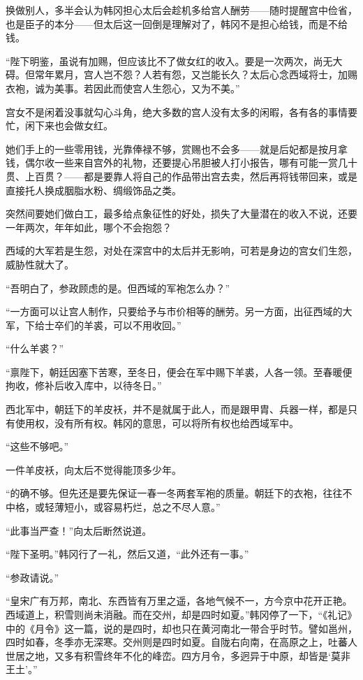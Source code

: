 换做别人，多半会认为韩冈担心太后会趁机多给宫人酬劳——随时提醒宫中俭省，也是臣子的本分——但太后这一回倒是理解对了，韩冈不是担心给钱，而是不给钱。

“陛下明鉴，虽说有加赐，但应该比不了做女红的收入。要是一次两次，尚无大碍。但常年累月，宫人岂不怨？人若有怨，又岂能长久？太后心念西域将士，加赐衣袍，诚为美事。若因此而使宫人生怨心，又为不美。”

宫女不是闲着没事就勾心斗角，绝大多数的宫人没有太多的闲暇，各有各的事情要忙，闲下来也会做女红。

她们手上的一些零用钱，光靠俸禄不够，赏赐也不会多——就是后妃都是按月拿钱，偶尔收一些来自宫外的礼物，还要提心吊胆被人打小报告，哪有可能一赏几十贯、上百贯？——都是要靠人将自己的作品带出宫去卖，然后再将钱带回来，或是直接托人换成胭脂水粉、绸缎饰品之类。

突然间要她们做白工，最多给点象征性的好处，损失了大量潜在的收入不说，还要一年两次，年年如此，哪个不会抱怨？

西域的大军若是生怨，对处在深宫中的太后并无影响，可若是身边的宫女们生怨，威胁性就大了。

“吾明白了，参政顾虑的是。但西域的军袍怎么办？”

“一方面可以让宫人制作，只要给予与市价相等的酬劳。另一方面，出征西域的大军，下给士卒们的羊裘，可以不用收回。”

“什么羊裘？”

“禀陛下，朝廷因塞下苦寒，至冬日，便会在军中赐下羊裘，人各一领。至春暖便拘收，修补后收入库中，以待冬日。”

西北军中，朝廷下的羊皮袄，并不是就属于此人，而是跟甲胄、兵器一样，都是只有使用权，没有所有权。韩冈的意思，可以将所有权也给西域军中。

“这些不够吧。”

一件羊皮袄，向太后不觉得能顶多少年。

“的确不够。但先还是要先保证一春一冬两套军袍的质量。朝廷下的衣袍，往往不中格，或轻薄短小，或容易朽烂，总之不尽人意。”

“此事当严查！”向太后断然说道。

“陛下圣明。”韩冈行了一礼，然后又道，“此外还有一事。”

“参政请说。”

“皇宋广有万邦，南北、东西皆有万里之遥，各地气候不一，方今京中花开正艳。西域道上，积雪则尚未消融。而在交州，却是四时如夏。”韩冈停了一下，“《礼记》中的《月令》这一篇，说的是四时，却也只在黄河南北一带合乎时节。譬如邕州，四时如春，冬季亦无深寒。交州则是四时如夏。自陇右向南，在高原之上，吐蕃人世居之地，又多有积雪终年不化的峰峦。四方月令，多迥异于中原，却皆是‘莫非王土’。”

